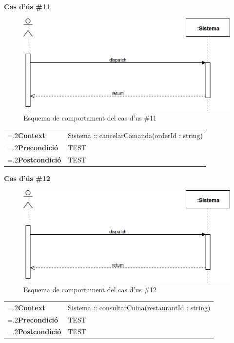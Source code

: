 \clearpage
\noindent\textbf{\large Cas d'ús \#11}\\
\begin{figure}[H]
\centering
\includegraphics[scale=0.6]{Figures/casdus_00.png}
\caption{Esquema de comportament del cas d'us \#11}
\end{figure}
\begin{table}[h]
\noindent
\begin{tabularx}{\linewidth}{
>{\hsize=.2\hsize}X%
>{\hsize=0.8\hsize}X%
}
\textbf{Context} 		& Sistema :: cancelarComanda(orderId : string) \\
\textbf{Precondició} 	& TEST \\
\textbf{Postcondició}	& TEST \\
\end{tabularx}
\label{}
\end{table}

\noindent\textbf{\large Cas d'ús \#12}\\
\begin{figure}[H]
\centering
\includegraphics[scale=0.6]{Figures/casdus_00.png}
\caption{Esquema de comportament del cas d'us \#12}
\end{figure}
\begin{table}[h]
\noindent
\begin{tabularx}{\linewidth}{
>{\hsize=.2\hsize}X%
>{\hsize=0.8\hsize}X%
}
\textbf{Context} 		& Sistema :: consultarCuina(restaurantId : string) \\
\textbf{Precondició} 	& TEST \\
\textbf{Postcondició}	& TEST \\
\end{tabularx}
\label{}
\end{table}

